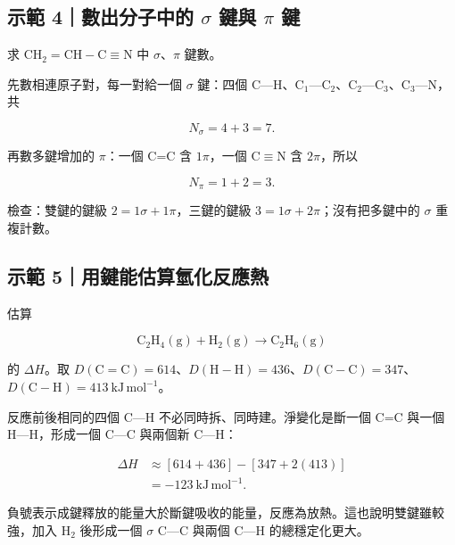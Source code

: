 \documentclass[11pt,a4paper]{article}
\begin{document}
\begin{HandoutWorkedExample}

\subsection{\texorpdfstring{示範 4｜數出分子中的 \(\sigma\) 鍵與 \(\pi\) 鍵}{示範 4｜數出分子中的 \textbackslash sigma 鍵與 \textbackslash pi 鍵}}\label{ux793aux7bc4-4ux6578ux51faux5206ux5b50ux4e2dux7684-sigma-ux9375ux8207-pi-ux9375}

求 \(\mathrm{CH_2=CH-C\equiv N}\) 中 \(\sigma\)、\(\pi\) 鍵數。

先數相連原子對，每一對給一個 \(\sigma\) 鍵：四個 C---H、C\(_1\)---C\(_2\)、C\(_2\)---C\(_3\)、C\(_3\)---N，共

\[
N_\sigma=4+3=7.
\]

再數多鍵增加的 \(\pi\)：一個 C=C 含 \(1\pi\)，一個 C\(\equiv\)N 含 \(2\pi\)，所以

\[
N_\pi=1+2=3.
\]

檢查：雙鍵的鍵級 \(2=1\sigma+1\pi\)，三鍵的鍵級 \(3=1\sigma+2\pi\)；沒有把多鍵中的 \(\sigma\) 重複計數。

\end{HandoutWorkedExample}

\begin{HandoutWorkedExample}

\subsection{示範 5｜用鍵能估算氫化反應熱}\label{ux793aux7bc4-5ux7528ux9375ux80fdux4f30ux7b97ux6c2bux5316ux53cdux61c9ux71b1}

估算

\[
\mathrm{C_2H_4(g)+H_2(g)\rightarrow C_2H_6(g)}
\]

的 \(\Delta H\)。取 \(D(\mathrm{C=C})=614\)、\(D(\mathrm{H-H})=436\)、\(D(\mathrm{C-C})=347\)、\(D(\mathrm{C-H})=413\ \mathrm{kJ\,mol^{-1}}\)。

反應前後相同的四個 C---H 不必同時拆、同時建。淨變化是斷一個 C=C 與一個 H---H，形成一個 C---C 與兩個新 C---H：

\[
\begin{aligned}
\Delta H
&\approx[614+436]-[347+2(413)]\\
&=-123\ \mathrm{kJ\,mol^{-1}}.
\end{aligned}
\]

負號表示成鍵釋放的能量大於斷鍵吸收的能量，反應為放熱。這也說明雙鍵雖較強，加入 H\(_2\) 後形成一個 \(\sigma\) C---C 與兩個 C---H 的總穩定化更大。

\end{HandoutWorkedExample}
\end{document}
